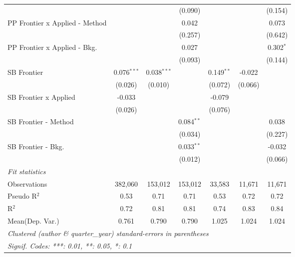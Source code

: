 \begin{tabular}{lcccccc}
                                  &                &               & (0.090)        &               &              & (0.154)\\   
   PP Frontier x Applied - Method &                &               & 0.042          &               &              & 0.073\\   
                                  &                &               & (0.257)        &               &              & (0.642)\\   
   PP Frontier x Applied - Bkg.   &                &               & 0.027          &               &              & 0.302$^{*}$\\   
                                  &                &               & (0.093)        &               &              & (0.144)\\   
   SB Frontier                    & 0.076$^{***}$  & 0.038$^{***}$ &                & 0.149$^{**}$  & -0.022       &   \\   
                                  & (0.026)        & (0.010)       &                & (0.072)       & (0.066)      &   \\   
   SB Frontier x Applied          & -0.033         &               &                & -0.079        &              &   \\   
                                  & (0.026)        &               &                & (0.076)       &              &   \\   
   SB Frontier - Method           &                &               & 0.084$^{**}$   &               &              & 0.038\\   
                                  &                &               & (0.034)        &               &              & (0.227)\\   
   SB Frontier - Bkg.             &                &               & 0.033$^{**}$   &               &              & -0.032\\   
                                  &                &               & (0.012)        &               &              & (0.066)\\   
   \midrule
   \emph{Fit statistics}\\
   Observations                   & 382,060        & 153,012       & 153,012        & 33,583        & 11,671       & 11,671\\  
   Pseudo R$^2$                   & 0.53           & 0.71          & 0.71           & 0.53          & 0.72         & 0.72\\  
   R$^2$                          & 0.72           & 0.81          & 0.81           & 0.74          & 0.83         & 0.84\\  
Mean(Dep. Var.) & 0.761 & 0.790 & 0.790 & 1.025 & 1.024 & 1.024 \\
   \midrule \midrule
   \multicolumn{7}{l}{\emph{Clustered (author \& quarter\_year) standard-errors in parentheses}}\\
   \multicolumn{7}{l}{\emph{Signif. Codes: ***: 0.01, **: 0.05, *: 0.1}}\\
\end{tabular}
\par\endgroup
